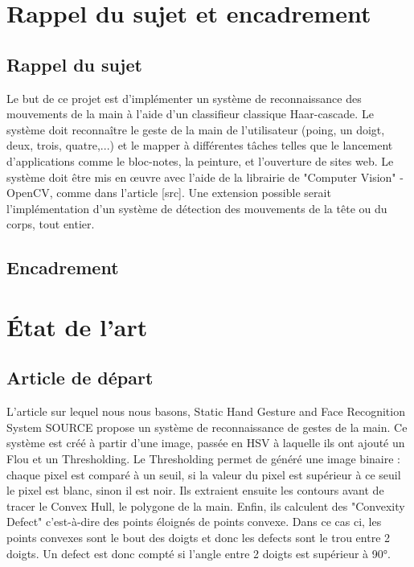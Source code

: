 \documentclass[11pt]{article}
\begin{document}
\newpage

\section{Rappel du sujet et encadrement}
\subsection{Rappel du sujet}

Le but de ce projet est d’implémenter un système de reconnaissance des mouvements de la
main à l’aide d’un classifieur classique Haar-cascade. Le système doit reconnaître le geste de
la main de l’utilisateur (poing, un doigt, deux, trois, quatre,...) et le mapper à différentes tâches
telles que le lancement d’applications comme le bloc-notes, la peinture, et l’ouverture de sites web.
Le système doit être mis en œuvre avec l’aide de la librairie de "Computer Vision" - OpenCV,
comme dans l’article [src]. Une extension possible serait l’implémentation d’un système de détection
des mouvements de la tête ou du corps, tout entier.

\subsection{Encadrement}

\newpage

\section{\'Etat de l'art}
\subsection{Article de départ}
L'article sur lequel nous nous basons, Static Hand Gesture and Face Recognition System {\LARGE SOURCE} propose un système de reconnaissance de gestes de la main. Ce système est créé à partir d'une image, passée en HSV à laquelle ils ont ajouté un Flou et un Thresholding. Le Thresholding permet de généré une image binaire :  chaque pixel est comparé à un seuil, si la valeur du pixel est supérieur à ce seuil le pixel est blanc, sinon il est noir. Ils extraient ensuite les contours avant de tracer le Convex Hull, le polygone de la main. Enfin, ils calculent des "Convexity Defect" c'est-à-dire des points éloignés de points convexe. Dans ce cas ci, les points convexes sont le bout des doigts et donc les defects sont le trou entre 2 doigts. Un defect est donc compté si l'angle entre 2 doigts est supérieur à 90°. \bigbreak
\end{document}
